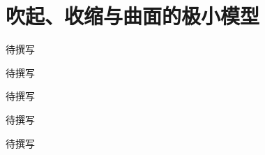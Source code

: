 
% 
% 

\chapter{吹起、收缩与曲面的极小模型}
\label{g5:ch:26}

\begin{chapterabstract}
待撰写
\end{chapterabstract}

\begin{learninggoals}
待撰写
\end{learninggoals}

待撰写






\begin{chaptersummary}
待撰写
\end{chaptersummary}

\BookExercises
待撰写
